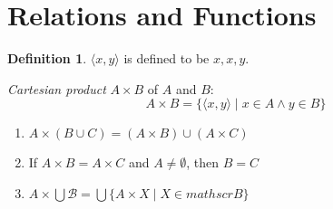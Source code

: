 \documentclass[letterpaper, 10pt]{article}
\numberwithin{thm}{section}
\theoremstyle{definition}
\newtheorem{mydef}[thm]{Definition}
\newcommand{\opair}[2]{\langle{#1}, {#2} \rangle}
\newcommand{\myset}[2]{\{{#1} \mid {#2}\}}
\begin{document}
\setcounter{section}{2}
\section{Relations and Functions}

\begin{mydef}
	$\opair{x}{y}$ is defined to be ${{x},{x,y}}$.
\end{mydef}

\emph{Cartesian product} $A \times B$ of $A$ and $B$:
\begin{equation}
	A \times B = \myset{\opair{x}{y}}{x \in A \land y \in B}
\end{equation}

\begin{enumerate}[label=\arabic*.]
	\item $A \times (B \cup C) = (A \times B) \cup (A \times C)$
	\item If $A \times B = A \times C$ and $A \ne \emptyset$, then $B = C$
	\item $A \times \bigcup\mathscr{B} = \bigcup\myset{A \times X}{X \in mathscr{B}}$
\end{enumerate}
\end{document}
